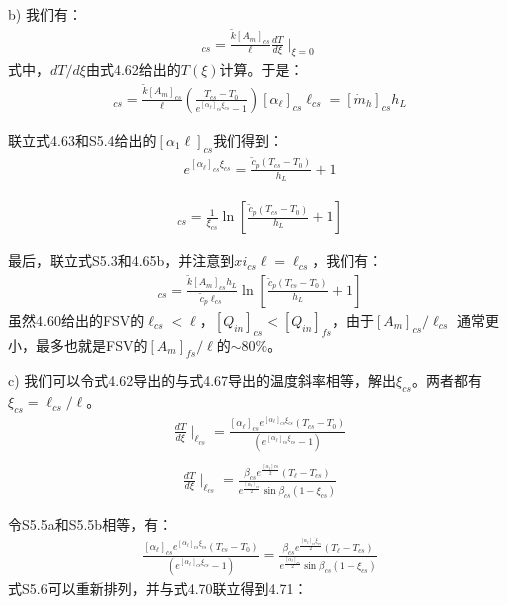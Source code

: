 b) 我们有：
\begin{align*}
[Q_{in}]_{cs}=\frac{\tilde{k}[A_m]_{cs}}{\ell}\frac{dT}{d\xi}\mid_{\xi=0} \tag{S5.3}
\end{align*}
式中，$dT/d\xi$由式4.62给出的$T(\xi)$计算。于是：
\begin{align*}
[Q_{in}]_{cs}=\frac{\tilde{k}[A_m]_{cs}}{\ell}\left(\frac{T_{cs}-T_0}{e^{[\alpha_\ell]_{cs}\xi_{cs}}-1}\right)[\alpha_\ell]_{cs}\ell_{cs}=[\dot{m}_h]_{cs}h_L \tag{S5.4}
\end{align*}

联立式4.63和S5.4给出的$[\alpha_{1}\ell]_{cs}$我们得到：
\begin{align*}%
e^{[\alpha_\ell]_{cs}\xi_{cs}}=\frac{\tilde{c}_p(T_{cs}-T_0)}{h_L}+1 \tag{4.65}
\end{align*}

\begin{align*}%
[\alpha_\ell]_{cs}=\frac{1}{\xi_{cs}}\ln\left[\frac{\tilde{c}_p(T_{cs}-T_0)}{h_L}+1\right] \tag{4.65b}
\end{align*}

最后，联立式S5.3和4.65b，并注意到$xi_{cs}\ell=\ell_{cs}$，我们有：
\begin{align*}%
[Q_{in}]_{cs}=\frac{\tilde{k}[A_m]_{cs}h_L}{\tilde{c}_p\ell_{cs}}\ln\left[\frac{\tilde{c}_p(T_{cs}-T_0)}{h_L}+1\right] \tag{4.64}
\end{align*}
虽然4.60给出的FSV的$\ell_{cs}<\ell$，$[Q_{in}]_{cs}<[Q_{in}]_{fs}$，由于$[A_m]_{cs}/\ell_{cs}$
通常更小，最多也就是FSV的$[A_m]_{fs}/\ell$的$\sim 80\%$。

c) 我们可以令式4.62导出的与式4.67导出的温度斜率相等，解出$\xi_{cs}$。两者都有$\xi_{cs}=\ell_{cs}/\ell$。
\begin{align*}
\frac{dT}{d\xi}\mid_{\ell_{cs}}=\frac{[\alpha_\ell]_{cs}e^{[\alpha_\ell]_{cs}\xi_{cs}}(T_{cs}-T_0)}{(e^{[\alpha_\ell]_{cs}\xi_{cs}}-1)}\\\tag{S5.5a}
\end{align*}
\begin{align*}
\frac{dT}{d\xi}\mid_{\ell_{cs}}=\frac{\beta_{cs}e^{\frac{[\alpha_\ell]{cs}}{2}}(T_\ell-T_{cs})}{e^{\frac{[\alpha_\ell]_{cs}}{2}}\sin\beta_{cs}(1-\xi_{cs})} \tag{S5.5b}
\end{align*}

令S5.5a和S5.5b相等，有：
\begin{align*}
\frac{[\alpha_\ell]_{cs}e^{[\alpha_\ell]_{cs}\xi_{cs}}(T_{cs}-T_0)}{(e^{[\alpha_\ell]_{cs}\xi_{cs}}-1)}
=\frac{\beta_{cs}e^{\frac{[\alpha_\ell]_{cs}\xi_{cs}}{2}}(T_\ell-T_{cs})}{e^{\frac{[\alpha_\ell]_{cs}}{2}}\sin\beta_{cs}(1-\xi_{cs})} \tag{S5.6}
\end{align*}
式S5.6可以重新排列，并与式4.70联立得到4.71：


